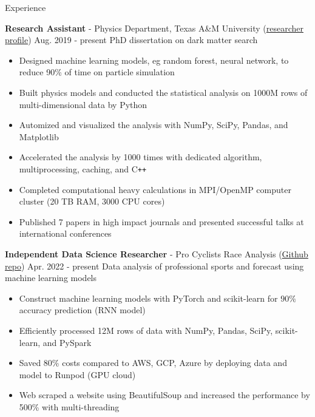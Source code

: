 \documentclass{resume}
\begin{document}
\begin{rSection}{Experience}
    \vspace{1em}
    \item \textbf{Research Assistant} - Physics Department, Texas A\&M University (\href{https://inspirehep.net/authors/2661451}{researcher profile}) \hfill Aug. 2019 - present
        \newline\hspace*{0.5em} {\normalsize PhD dissertation on dark matter search}
        \begin{itemize}
        \item Designed machine learning models, eg random forest, neural network, to reduce 90\% of time on particle simulation
        \item Built physics models and conducted the statistical analysis on 1000M rows of multi-dimensional data by Python
        \item Automized and visualized the analysis with NumPy, SciPy, Pandas, and Matplotlib
        \item Accelerated the analysis by 1000 times with dedicated algorithm, multiprocessing, caching, and C\texttt{++}
        \item Completed computational heavy calculations in MPI/OpenMP computer cluster (20 TB RAM, 3000 CPU cores)
        \item Published 7 papers in high impact journals and presented successful talks at international conferences
        \end{itemize}

    \vspace{1em}
    \item \textbf{Independent Data Science Researcher} - {Pro Cyclists Race Analysis} (\href{https://github.com/noctildon/pro_cyclists}{Github repo}) \hfill Apr. 2022 - present
        \newline\hspace*{0.5em} {\normalsize Data analysis of professional sports and forecast using machine learning models}
        \begin{itemize}
        \item Construct machine learning models with PyTorch and scikit-learn for $90\%$ accuracy prediction (RNN model)
        \item Efficiently processed 12M rows of data with NumPy, Pandas, SciPy, scikit-learn, and PySpark
        \item Saved 80\% costs compared to AWS, GCP, Azure by deploying data and model to Runpod (GPU cloud)
        \item Web scraped a website using BeautifulSoup and increased the performance by 500\% with multi-threading
        \end{itemize}


\end{rSection}
\end{document}
